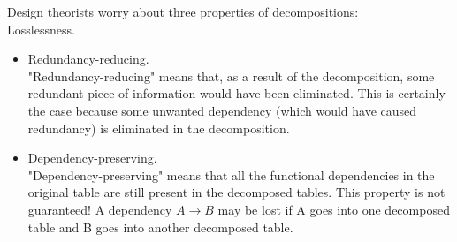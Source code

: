 Design theorists worry about three properties of decompositions: \\
Losslessness. 
\begin{itemize}
  \item Redundancy-reducing. \\
"Redundancy-reducing" means that, as a result of the decomposition, some redundant piece of information would have been eliminated.
This is certainly the case because some unwanted dependency (which would have caused redundancy) is eliminated in the decomposition.
  \item Dependency-preserving. \\
"Dependency-preserving" means that all the functional dependencies in the original table are still present in the decomposed tables.
This property is not guaranteed!
A dependency $A \rightarrow B$ may be lost if A goes into one decomposed table and B goes into another decomposed table.
\end{itemize}